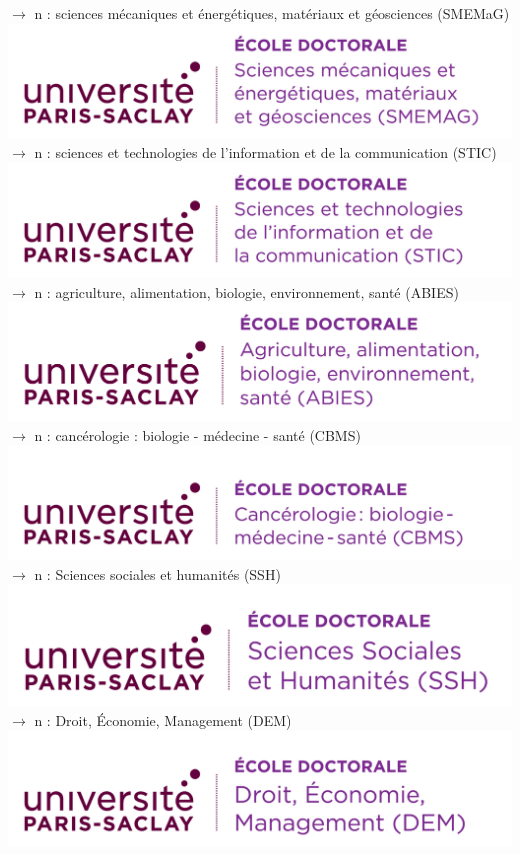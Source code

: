 \documentclass[french,12pt,a4paper]{book}
\begin{document}
\noindent \textbf{\color{Prune}$\rightarrow$} n : sciences mécaniques et énergétiques, matériaux et géosciences  (SMEMaG)\\
\includegraphics[scale=.7]{logo_usp_SMEMAG}\\
\newpage
\noindent \textbf{\color{Prune}$\rightarrow$} n : sciences et technologies de l'information et de la communication (STIC)\\
\includegraphics[scale=.7]{logo_usp_STIC}\\

\noindent \textbf{\color{Prune}$\rightarrow$} n : agriculture, alimentation, biologie, environnement, santé (ABIES)\\
\includegraphics[scale=.7]{logo_usp_ABIES}\\

\noindent \textbf{\color{Prune}$\rightarrow$} n : cancérologie : biologie - médecine - santé (CBMS)\\
\includegraphics[scale=.7]{logo_usp_CBMS}\\

\noindent \textbf{\color{Prune}$\rightarrow$} n : Sciences sociales et humanités (SSH)\\
\includegraphics[scale=.7]{logo_usp_SSH}\\

\noindent \textbf{\color{Prune}$\rightarrow$} n : Droit, Économie, Management (DEM)\\
\includegraphics[scale=.7]{logo_usp_DEM}\\
\end{document}
